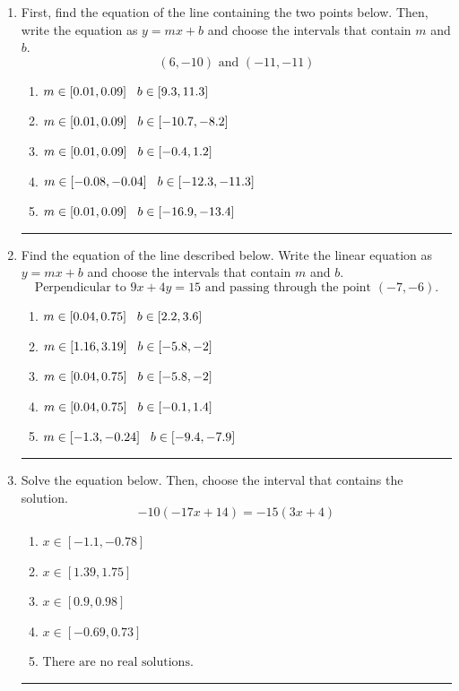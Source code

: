 \documentclass[14pt]{extbook}
\newcommand{\litem}[1]{\item#1\hspace*{-1cm}\rule{\textwidth}{0.4pt}}
\begin{document}
\begin{enumerate}
\litem{
First, find the equation of the line containing the two points below. Then, write the equation as $ y=mx+b $ and choose the intervals that contain $m$ and $b$.\[ (6, -10) \text{ and } (-11, -11) \]\begin{enumerate}[label=\Alph*.]
\item \( m \in [0.01, 0.09] \hspace*{3mm} b \in [9.3, 11.3] \)
\item \( m \in [0.01, 0.09] \hspace*{3mm} b \in [-10.7, -8.2] \)
\item \( m \in [0.01, 0.09] \hspace*{3mm} b \in [-0.4, 1.2] \)
\item \( m \in [-0.08, -0.04] \hspace*{3mm} b \in [-12.3, -11.3] \)
\item \( m \in [0.01, 0.09] \hspace*{3mm} b \in [-16.9, -13.4] \)

\end{enumerate} }
\litem{
Find the equation of the line described below. Write the linear equation as $ y=mx+b $ and choose the intervals that contain $m$ and $b$.\[ \text{Perpendicular to } 9 x + 4 y = 15 \text{ and passing through the point } (-7, -6). \]\begin{enumerate}[label=\Alph*.]
\item \( m \in [0.04, 0.75] \hspace*{3mm} b \in [2.2, 3.6] \)
\item \( m \in [1.16, 3.19] \hspace*{3mm} b \in [-5.8, -2] \)
\item \( m \in [0.04, 0.75] \hspace*{3mm} b \in [-5.8, -2] \)
\item \( m \in [0.04, 0.75] \hspace*{3mm} b \in [-0.1, 1.4] \)
\item \( m \in [-1.3, -0.24] \hspace*{3mm} b \in [-9.4, -7.9] \)

\end{enumerate} }
\litem{
Solve the equation below. Then, choose the interval that contains the solution.\[ -10(-17x + 14) = -15(3x + 4) \]\begin{enumerate}[label=\Alph*.]
\item \( x \in [-1.1, -0.78] \)
\item \( x \in [1.39, 1.75] \)
\item \( x \in [0.9, 0.98] \)
\item \( x \in [-0.69, 0.73] \)
\item \( \text{There are no real solutions.} \)


\end{enumerate}}
\end{enumerate}
\end{document}
